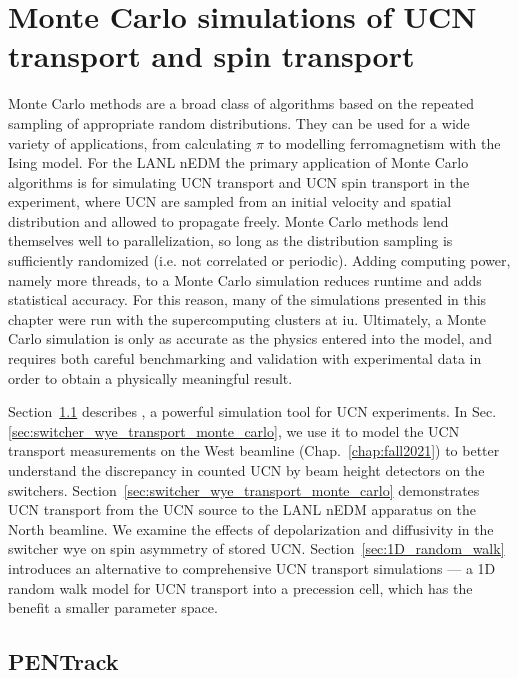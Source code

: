 
\chapter{Monte Carlo simulations of UCN transport and spin transport}\label{chap:simulations}


Monte Carlo methods are a broad class of algorithms based on the repeated sampling of appropriate random distributions. They can be used for a wide variety of applications, from calculating $\pi$ to modelling ferromagnetism with the Ising model. For the LANL nEDM the primary application of Monte Carlo algorithms is for simulating UCN transport and UCN spin transport in the experiment, where UCN are sampled from an initial velocity and spatial distribution and allowed to propagate freely. Monte Carlo methods lend themselves well to parallelization, so long as the distribution sampling is sufficiently randomized (i.e. not correlated or periodic). Adding computing power, namely more threads, to a Monte Carlo simulation reduces runtime and adds statistical accuracy. For this reason, many of the simulations presented in this chapter were run with the supercomputing clusters at \acrshort{iu}. Ultimately, a Monte Carlo simulation is only as accurate as the physics entered into the model, and requires both careful benchmarking and validation with experimental data in order to obtain a physically meaningful result.

Section~\ref{sec:pentrack} describes \pentrack, a powerful simulation tool for UCN experiments. In Sec. \ref{sec:switcher_wye_transport_monte_carlo}, we use it to model the UCN transport measurements on the West beamline (Chap.~\ref{chap:fall2021}) to better understand the discrepancy in counted UCN by beam height detectors on the switchers. Section~\ref{sec:switcher_wye_transport_monte_carlo} demonstrates UCN transport from the UCN source to the LANL nEDM apparatus on the North beamline. We examine the effects of depolarization and diffusivity in the switcher wye on spin asymmetry of stored UCN. Section~\ref{sec:1D_random_walk} introduces an alternative to comprehensive UCN transport simulations --- a 1D random walk model for UCN transport into a precession cell, which has the benefit a smaller parameter space.


\section{PENTrack}\label{sec:pentrack}

